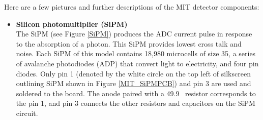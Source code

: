 Here are a few pictures and further descriptions of the MIT detector components:
\begin{itemize}
\item {\bf Silicon photomultiplier (SiPM)} \\
The SiPM (see Figure \ref{SiPM}) produces the ADC current pulse in response to the absorption of a photon.  This SiPM provides lowest cross talk and noise. Each SiPM of this model contains 18,980 microcells of size 35\textmu, a series of avalanche photodiodes (ADP) that convert light to electricity, and four pin diodes. Only pin 1 (denoted by the white circle on the top left of silkscreen outlining SiPM shown in Figure \ref{MIT_SiPMPCB}) and pin 3 are used and soldered to the board. The anode paired with a 49.9 \textOmega \ resistor corresponds to the pin 1, and pin 3 connects the other resistors and capacitors on the SiPM circuit. 


\end{itemize}
